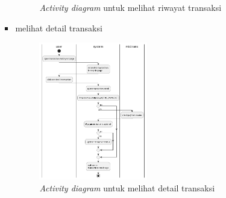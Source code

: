 \documentclass[a4paper]{article}
\begin{document}
\begin{enumerate}
\begin{enumerate}
\begin{itemize}
\begin{figure}[h]
                \caption{\textit{Activity diagram} untuk melihat riwayat transaksi}
            \end{figure}
            \item melihat detail transaksi
            \begin{figure}[h]
                \centering
                \includegraphics*[height=6cm]{./diagram/activity diagram/15. transaction/view transaction detail/view transaction detail.png}
                \caption{\textit{Activity diagram} untuk melihat detail transaksi}
            \end{figure}
        \end{itemize}
        \newpage


\end{enumerate}
\end{enumerate}
\end{document}
